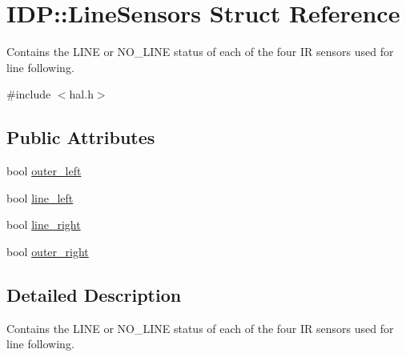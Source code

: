 \hypertarget{structIDP_1_1LineSensors}{
\section{IDP::LineSensors Struct Reference}
\label{structIDP_1_1LineSensors}
}


Contains the LINE or NO\_\-LINE status of each of the four IR sensors used for line following.  




{\ttfamily \#include $<$hal.h$>$}

\subsection*{Public Attributes}
\begin{DoxyCompactItemize}
\item 
bool \hyperlink{structIDP_1_1LineSensors_a51c88077f39fead3a34ef115bdcdc7f1}{outer\_\-left}
\item 
bool \hyperlink{structIDP_1_1LineSensors_a7b100b91da805356d2d138311029bc5a}{line\_\-left}
\item 
bool \hyperlink{structIDP_1_1LineSensors_a13a49feb63d5ced6b51b1d5be7f5109a}{line\_\-right}
\item 
bool \hyperlink{structIDP_1_1LineSensors_a73f08dd5931bdc244d94f578f7dd0a17}{outer\_\-right}
\end{DoxyCompactItemize}


\subsection{Detailed Description}
Contains the LINE or NO\_\-LINE status of each of the four IR sensors used for line following. 

